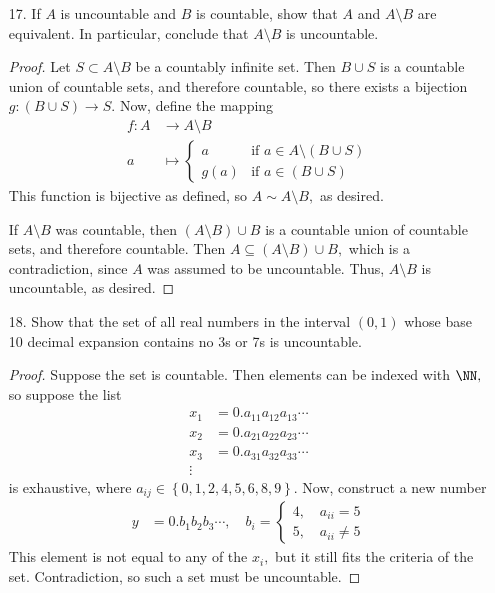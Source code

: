 \documentclass{article}
\begin{document}
\begin{itemize}
	\item[17.] If $A$ is uncountable and $B$ is countable, show that $A$ and $A\setminus B$ are equivalent. In particular, conclude that $A\setminus B$ is uncountable.
		\begin{proof}
			Let $S\subset A\setminus B$ be a countably infinite set. Then $B\cup S$ is a countable union of countable sets, and therefore countable, so there exists a bijection $g:(B\cup S)\to S.$ Now, define the mapping
			\begin{align*}
				f:A &\to A\setminus B \\
				a &\mapsto \begin{cases}
					a & \text{if } a\in A\setminus(B\cup S) \\
					g(a) & \text{if } a\in (B\cup S)
				\end{cases}
			\end{align*}
			This function is bijective as defined, so $A\sim A\setminus B,$ as desired. 

			If $A\setminus B$ was countable, then $(A\setminus B)\cup B$ is a countable union of countable sets, and therefore countable. Then $A\subseteq (A\setminus B)\cup B,$ which is a contradiction, since $A$ was assumed to be uncountable. Thus, $A\setminus B$ is uncountable, as desired.
		\end{proof}

		\newpage
	\item[18.] Show that the set of all real numbers in the interval $(0, 1)$ whose base 10 decimal expansion contains no 3s or 7s is uncountable.
		\begin{proof}
			Suppose the set is countable. Then elements can be indexed with $\NN,$ so suppose the list
			\begin{align*}
				x_1 &= 0.a_{11}a_{12}a_{13}\cdots \\
				x_2 &= 0.a_{21}a_{22}a_{23}\cdots \\
				x_3 &= 0.a_{31}a_{32}a_{33}\cdots \\
				\vdots
			\end{align*}
			is exhaustive, where $a_{ij}\in\left\{ 0, 1, 2, 4, 5, 6, 8, 9 \right\}.$ Now, construct a new number
			\begin{align*}
				y &= 0.b_1b_2b_3\cdots, \quad b_i = \begin{cases}
					4, \quad a_{ii} = 5 \\
					5, \quad a_{ii}\neq 5
				\end{cases}
			\end{align*}
			This element is not equal to any of the $x_i,$ but it still fits the criteria of the set. Contradiction, so such a set must be uncountable.
		\end{proof}
		
\end{itemize}
\end{document}
